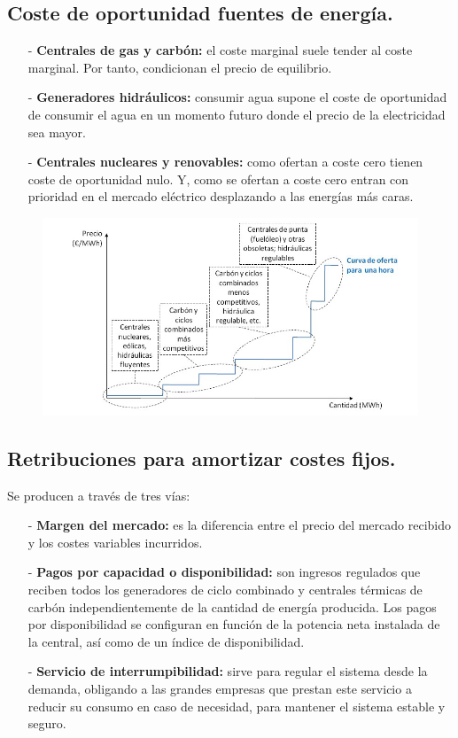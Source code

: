 \subsection{Coste de oportunidad fuentes de energía.}
\begin{itemize}
	\item [-]\textbf{Centrales de gas y carbón:} el coste marginal suele tender al coste marginal. Por tanto, condicionan el precio de equilibrio. 
	\item [-]\textbf{Generadores hidráulicos:} consumir agua supone el coste de oportunidad de consumir el agua en un momento futuro donde el precio de la electricidad sea mayor.
	\item [-]\textbf{Centrales nucleares y renovables:} como ofertan a coste cero tienen coste de oportunidad nulo. Y, como se ofertan a coste cero entran con prioridad en el mercado eléctrico desplazando a las energías más caras.
\end{itemize}
\begin{figure}[H]
	\centering
	\includegraphics[width=0.7\linewidth]{res/tema4/curvaDemanda}
	\label{fig:curvademanda}
\end{figure}
\subsection{Retribuciones para amortizar costes fijos.}
Se producen a través de tres vías:
\begin{itemize}
	\item [-]\textbf{Margen del mercado:} es la diferencia entre el precio del mercado recibido y los costes variables incurridos.
	\item [-]\textbf{Pagos por capacidad o disponibilidad:} son ingresos regulados que reciben todos los generadores de ciclo
	combinado y centrales térmicas de carbón independientemente de la cantidad de energía
	producida. Los pagos por disponibilidad se configuran en función de la potencia neta instalada de la central,
	así como de un índice de disponibilidad.
	\item [-]\textbf{Servicio de interrumpibilidad:} sirve para regular el sistema desde la demanda, obligando a las grandes empresas
	que prestan este servicio a reducir su consumo en caso de necesidad, para mantener el sistema
	estable y seguro.
\end{itemize}
